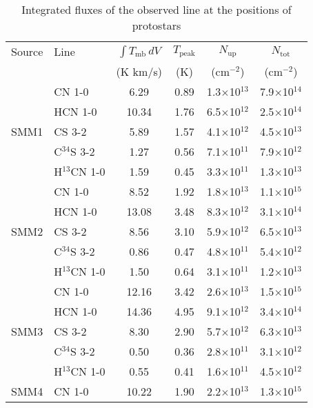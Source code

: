 \documentclass{aa}
\begin{document}
\begin{table*} \caption{Integrated fluxes of the observed line at the positions of protostars}      
      \label{table:fluxes}      %
\centering                          %
\begin{tabular}{l l c c c c}
\hline\hline Source & Line & $\int{T_{\mathrm{mb}} \, dV}$ & $T_\mathrm{peak}$ & $N_\mathrm{up}$ &
$N_\mathrm{tot}$\\ 
&  & (K km/s) & (K) & (cm$^{-2}$) & (cm$^{-2}$) \\ 
\hline \multirow{5}{*}{SMM1} & CN 1-0 & 6.29 & 0.89 & 1.3$\times$10$^{13}$ & 7.9$\times$10$^{14}$\\
 {} & HCN 1-0 & 10.34 & 1.76 & 6.5$\times$10$^{12}$ & 2.5$\times$10$^{14}$\\
  {} & CS 3-2 & 5.89 & 1.57 & 4.1$\times$10$^{12}$ & 4.5$\times$10$^{13}$\\
   {} & C$^{34}$S 3-2 & 1.27 & 0.56 & 7.1$\times$10$^{11}$ & 7.9$\times$10$^{12}$\\
    {} & H$^{13}$CN 1-0 & 1.59 & 0.45 & 3.3$\times$10$^{11}$ & 1.3$\times$10$^{13}$\\
\hline \multirow{5}{*}{SMM2} & CN 1-0 & 8.52 & 1.92 & 1.8$\times$10$^{13}$ & 1.1$\times$10$^{15}$ \\
 {} & HCN 1-0 & 13.08 & 3.48 & 8.3$\times$10$^{12}$ & 3.1$\times$10$^{14}$\\
{} & CS 3-2 & 8.56 & 3.10 & 5.9$\times$10$^{12}$ & 6.5$\times$10$^{13}$\\ 
{} & C$^{34}$S 3-2 & 0.86 & 0.47 & 4.8$\times$10$^{11}$ & 5.4$\times$10$^{12}$\\
 {} & H$^{13}$CN 1-0 & 1.50 & 0.64 & 3.1$\times$10$^{11}$ & 1.2$\times$10$^{13}$\\ 
 \hline \multirow{5}{*}{SMM3} & CN 1-0 & 12.16 & 3.42 & 2.6$\times$10$^{13}$ & 1.5$\times$10$^{15}$\\
  {} & HCN 1-0 & 14.36 & 4.95 & 9.1$\times$10$^{12}$ & 3.4$\times$10$^{14}$\\
   {} & CS 3-2 & 8.30 & 2.90 & 5.7$\times$10$^{12}$ & 6.3$\times$10$^{13}$\\ 
   {} & C$^{34}$S 3-2 & 0.50 & 0.36 & 2.8$\times$10$^{11}$ & 3.1$\times$10$^{12}$\\
    {} & H$^{13}$CN 1-0 & 0.55 & 0.41 & 1.6$\times$10$^{11}$ & 4.5$\times$10$^{12}$\\ 
    \hline \multirow{5}{*}{SMM4} & CN 1-0 & 10.22 & 1.90 & 2.2$\times$10$^{13}$ & 1.3$\times$10$^{15}$\\

\end{tabular}
\end{table*}
\end{document}
